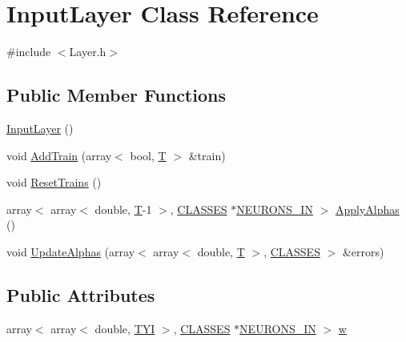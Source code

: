 \hypertarget{class_input_layer}{}\section{Input\+Layer Class Reference}
\label{class_input_layer}


{\ttfamily \#include $<$Layer.\+h$>$}

\subsection*{Public Member Functions}
\begin{DoxyCompactItemize}
\item 
\mbox{\hyperlink{class_input_layer_adac148f0626b911f30fd2396b8eb925a}{Input\+Layer}} ()
\item 
void \mbox{\hyperlink{class_input_layer_aadd73c016c015a4d9a5a9d39cb16c972}{Add\+Train}} (array$<$ bool, \mbox{\hyperlink{_constants_8h_a6108cec236ef7a2e1d3259931de87186}{T}} $>$ \&train)
\item 
void \mbox{\hyperlink{class_input_layer_a1959584bdc493411f3f2ed4648636e26}{Reset\+Trains}} ()
\item 
array$<$ array$<$ double, \mbox{\hyperlink{_constants_8h_a6108cec236ef7a2e1d3259931de87186}{T}}-\/1 $>$, \mbox{\hyperlink{_constants_8h_a12148c0e36153a905f4f6ef1afdbb27e}{C\+L\+A\+S\+S\+ES}} $\ast$\mbox{\hyperlink{_constants_8h_aefc2426e4681da445c7793c98a83c532}{N\+E\+U\+R\+O\+N\+S\+\_\+\+IN}} $>$ \mbox{\hyperlink{class_input_layer_a4bbcf9d128d6552c65fb3f9a2cc5d1c7}{Apply\+Alphas}} ()
\item 
void \mbox{\hyperlink{class_input_layer_ade39f022f70cab37b342e34ac18b8baf}{Update\+Alphas}} (array$<$ array$<$ double, \mbox{\hyperlink{_constants_8h_a6108cec236ef7a2e1d3259931de87186}{T}} $>$, \mbox{\hyperlink{_constants_8h_a12148c0e36153a905f4f6ef1afdbb27e}{C\+L\+A\+S\+S\+ES}} $>$ \&errors)
\end{DoxyCompactItemize}
\subsection*{Public Attributes}
\begin{DoxyCompactItemize}
\item 
array$<$ array$<$ double, \mbox{\hyperlink{_constants_8h_a45bcfb91788c7d66f5de11604fb1eb6e}{T\+YI}} $>$, \mbox{\hyperlink{_constants_8h_a12148c0e36153a905f4f6ef1afdbb27e}{C\+L\+A\+S\+S\+ES}} $\ast$\mbox{\hyperlink{_constants_8h_aefc2426e4681da445c7793c98a83c532}{N\+E\+U\+R\+O\+N\+S\+\_\+\+IN}} $>$ \mbox{\hyperlink{class_input_layer_a89903c767c8ba1ef611feeaa65f9a0d1}{w}}
\end{DoxyCompactItemize}
